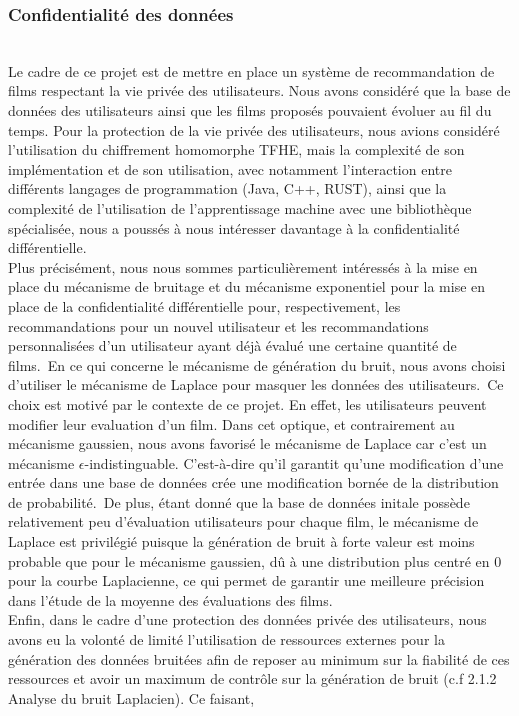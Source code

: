 \documentclass{article}
\begin{document}
\subsubsection{Confidentialité des données}
$ $\\
Le cadre de ce projet est de mettre en place un système de recommandation de films respectant la vie privée des utilisateurs. Nous avons
considéré que la base de données des utilisateurs ainsi que les films proposés pouvaient évoluer au fil du temps.
Pour la protection de la vie privée des utilisateurs, nous avions considéré l'utilisation du chiffrement homomorphe TFHE, mais
la complexité de son implémentation et de son utilisation, avec notamment l'interaction entre différents langages de programmation (Java, C++, RUST),
ainsi que la complexité de l'utilisation de l'apprentissage machine avec une bibliothèque spécialisée, nous a poussés à nous intéresser davantage à la confidentialité différentielle.\\
Plus précisément, nous nous sommes particulièrement intéressés à la mise en place du mécanisme de bruitage et du mécanisme exponentiel pour la mise
en place de la confidentialité différentielle pour, respectivement, les recommandations pour un nouvel utilisateur et les recommandations personnalisées
d'un utilisateur ayant déjà évalué une certaine quantité de films.\
En ce qui concerne le mécanisme de génération du bruit, nous avons choisi d'utiliser le mécanisme de Laplace pour masquer les données des utilisateurs.\
Ce choix est motivé par le contexte de ce projet. En effet, les utilisateurs peuvent modifier leur evaluation d'un film. Dans cet optique, et contrairement au
mécanisme gaussien, nous avons favorisé le mécanisme de Laplace car c'est un mécanisme $\epsilon$-indistinguable. C'est-à-dire qu'il garantit qu'une
modification d'une entrée dans une base de données crée une modification bornée de la distribution de probabilité.\
De plus, étant donné que la base de données initale possède relativement peu d'évaluation utilisateurs pour chaque film, le mécanisme de Laplace est privilégié
puisque la génération de bruit à forte valeur est moins probable que pour le mécanisme gaussien, dû à une distribution plus centré en 0 pour la courbe Laplacienne,
ce qui permet de garantir une meilleure précision dans l'étude de la moyenne des évaluations des films.\\
Enfin, dans le cadre d'une protection des données privée des utilisateurs, nous avons eu la volonté de limité l'utilisation de ressources externes
pour la génération des données bruitées afin de reposer au minimum sur la fiabilité de ces ressources et avoir un maximum de contrôle sur la génération de bruit (c.f 2.1.2 Analyse du bruit Laplacien). Ce faisant,
\end{document}
